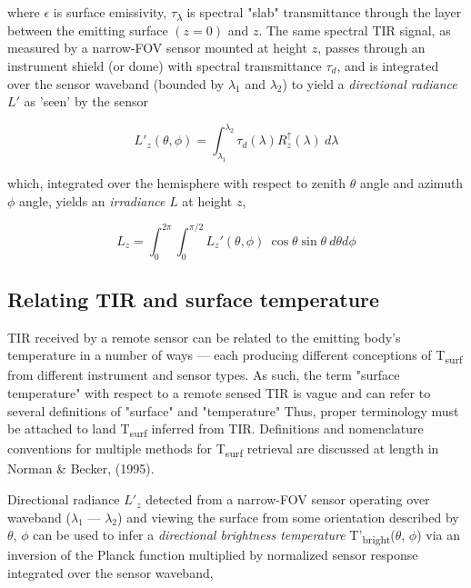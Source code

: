 \noindent where \(\epsilon\) is surface emissivity, \(\tau\)\textsubscript{\( \lambda \)} is spectral "slab" transmittance through the layer between the emitting surface $( z  = 0) $ and $ z $. The same spectral TIR signal, as measured by a narrow-FOV sensor mounted at height $ z $, passes through an instrument shield (or dome) with spectral transmittance \(\tau_d\), and is integrated over the sensor waveband (bounded by \(\lambda_1\) and \(\lambda_2\)) to yield a \textit{directional radiance} $L'$ as 'seen' by the sensor

\begin{equation}
L'_z (\theta, \phi) = \int_{\lambda_1}^{\lambda_2} \tau_d(\lambda) R^\uparrow_z(\lambda) ~ d\lambda
\end{equation}

\noindent which, integrated over the hemisphere with respect to zenith \(\theta\) angle and azimuth \(\phi\) angle, yields an \textit{irradiance} $ L $ at height $ z $,

\begin{equation}
L_z = \int_{0}^{2\pi} \int_{0}^{\pi/2} L_z'(\theta, \phi) ~ \cos\theta \sin\theta ~ d\theta d\phi
\end{equation}

\subsection{Relating TIR and surface temperature}

TIR received by a remote sensor can be related to the emitting body's temperature in a number of ways --- each producing different conceptions of T\textsubscript{surf} from different instrument and sensor types. As such, the term "surface temperature" with respect to a remote sensed TIR is vague and can refer to several definitions of "surface" and "temperature" Thus, proper terminology must be attached to land T\textsubscript{surf} inferred from TIR. Definitions and nomenclature conventions for multiple methods for T\textsubscript{surf} retrieval are discussed at length in Norman \& Becker, (1995)\cite{Norman1995}.

Directional radiance $ L'_z $ detected from a narrow-FOV sensor operating over waveband (\(\lambda_1\) --- \(\lambda_2\)) and viewing the surface from some orientation described by \(\theta\), \(\phi\) can be used to infer a \textit{directional brightness temperature} T'\textsubscript{bright}(\(\theta\), \(\phi\)) via an inversion of the Planck function multiplied by normalized sensor response integrated over the sensor waveband,

